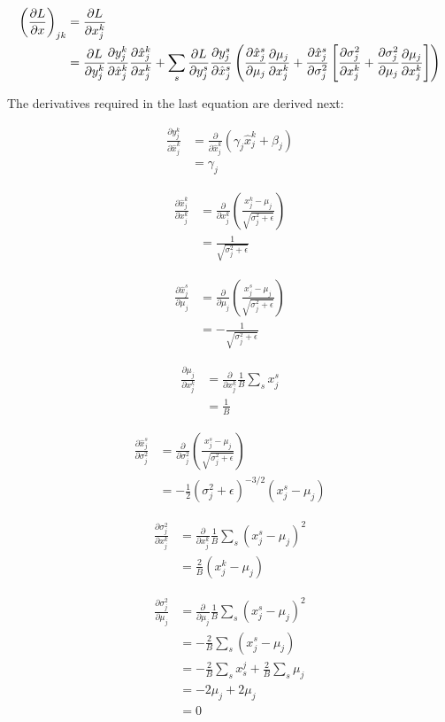 \documentclass{article}
\newcommand{\pd}[2]{\frac{\partial #1}{\partial #2}}
\begin{document}
\begin{align}
\left(\pd{L}{x}\right)_{jk} &= \pd{L}{x_j^k} \notag \\
&= \pd{L}{y_j^k}\pd{y_j^k}{\hat{x}_j^k}\pd{\hat{x}_j^k}{x_j^k} + \sum_s \pd{L}{y_j^s}\pd{y_j^s}{\hat{x}_j^s}\left(\pd{\hat{x}_j^s}{\mu_j}\pd{\mu_j}{x_j^k} + \pd{\hat{x}_j^s}{\sigma_j^2}\left[\pd{\sigma_j^2}{x_j^k} + \pd{\sigma_j^2}{\mu_j}\pd{\mu_j}{x_j^k} \right] \right) \label{eq:dldx}
\end{align}

The derivatives required in the last equation are derived next:

\begin{align*}
\pd{y_j^k}{\hat{x}_j^k} &= \pd{}{\hat{x}_j^k}(\gamma_j\hat{x}_j^k + \beta_j) \\
&= \gamma_j
\end{align*}

\begin{align*}
\pd{\hat{x}_j^k}{x_j^k} &= \pd{}{x_j^k}\left(\frac{x_j^k - \mu_j}{\sqrt{\sigma_j^2+\epsilon}}\right) \\
&=
\frac{1}{\sqrt{\sigma_j^2 + \epsilon}}
\end{align*}

\begin{align*}
\pd{\hat{x}_j^s}{\mu_j} &= \pd{}{\mu_j}\left(\frac{x_j^s - \mu_j}{\sqrt{\sigma_j^2+\epsilon}}\right)\\
&=
-\frac{1}{\sqrt{\sigma_j^2 + \epsilon}}
\end{align*}

\begin{align*}
\pd{\mu_j}{x_j^k} &= \pd{}{x_j^k}\frac{1}{B}\sum_s x_j^s \\
&= \frac{1}{B}
\end{align*}

\begin{align*}
\pd{\hat{x}_j^s}{\sigma_j^2} &=
\pd{}{\sigma_j^2}\left(\frac{x_j^s - \mu_j}{\sqrt{\sigma_j^2+\epsilon}}\right) \\
&=
-\frac{1}{2}(\sigma_j^2 + \epsilon)^{-3/2}(x_j^s - \mu_j)
\end{align*}

\begin{align*}
\pd{\sigma_j^2}{x_j^k} &= \pd{}{x_j^k}\frac{1}{B}\sum_s (x_j^s - \mu_j)^2\\
&=
\frac{2}{B}(x_j^k - \mu_j)
\end{align*}

\begin{align*}
\pd{\sigma^2_j}{\mu_j} &= \pd{}{\mu_j}\frac{1}{B}\sum_s (x_j^s - \mu_j)^2\\
&=
-\frac{2}{B}\sum_s(x_j^s - \mu_j) \\
&=
-\frac{2}{B}\sum_s x_s^j + \frac{2}{B}\sum_s \mu_j \\
&=
-2\mu_j + 2\mu_j \\
&= 0
\end{align*}
\end{document}
